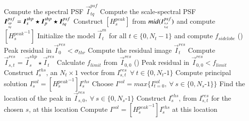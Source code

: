 \documentclass[structabstract]{stylefiles/aa}
\begin{document}
\begin{algorithm}[Ht!]
  \vspace{0.5cm} 
  {
        { Compute the spectral PSF } $\vec{I}^{psf}_{tq}$\;
	{
		{Compute the scale-spectral PSF} $\vec{I}^{psf}_{{sp}\atop{tq}} = \vec{I}^{shp}_s \star \vec{I}^{shp}_p \star \vec{I}^{psf}_{tq} $\;
	}
  }
  {
     Construct $[{H^{peak}_s}]$ from $mid(I^{psf}_{{s,s}\atop{t,q}})$ and compute $[{H^{peak}_s}^{-1}]$\;
  }
  Initialize the model $\vec{I}^{m}_t$ for all $t \in \{0,N_t-1\}$ and compute $f_{sidelobe}$ \;
  \Repeat () { Peak residual in $\vec{I}^{res}_0 < \sigma_{thr}$ }
  {
    {
      Compute the residual image $\vec{I}^{res}_t$ \;
      {
	      Compute $\vec{I}^{res}_{{s},{t}} = \vec{I}^{shp}_s \star \vec{I}^{res}_t$
      }
    }
    Calculate $f_{limit}$ from $\vec{I}^{res}_{0,0}$\;
    \Repeat (){ Peak residual in $\vec{I}^{res}_{0,0} < f_{limit} $ } 
    {
     {
      {
       {
          Construct $I^{rhs}_s$, an $N_t\times 1$ vector from $I^{res}_{s,t} ~~\forall ~ t \in \{0,N_t$-$1\}$\;
          Compute principal solution $I^{sol}_s = [{H^{peak}_s}^{-1}] I^{rhs}_s$\;
       }
       Choose $I^{sol} = max\{I^{sol}_{t=0},~\forall~s\in\{0,N_s$-$1\}\}$ \;
      }
      \Else
      {
       Find the location of the peak in $\vec{I}^{res}_{s,0},~\forall~s\in\{0,N_s$-$1\}$\;
       Construct $I^{rhs}_s$, from $I^{res}_{s,t}$ for the chosen $s$, at this location\;
       Compute $I^{sol} = [{H^{peak}_s}^{-1}] I^{rhs}_s$ at this location\;
}}}}
\end{algorithm}
\end{document}
